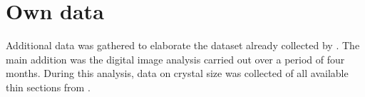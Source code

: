 \section{Own data}
Additional data was gathered to elaborate the dataset already collected by \Textcite{Heins_1992}. %
The main addition was the digital image analysis carried out over a period of four months. %
During this analysis, data on crystal size was collected of all available thin sections from \Textcite{Heins_1992}. %



\cleardoublepage

